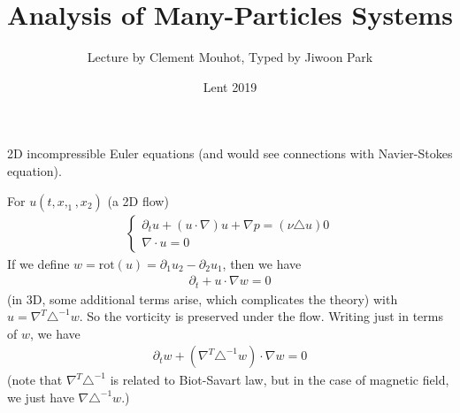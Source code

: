 \documentclass[12pt,a4paper]{extarticle}
\DeclarePairedDelimiter\bignorm{\lVert}{\rVert}
\begin{document}
\newcommand{\lap}{\triangle} %
\newcommand{\s}{\vspace{10pt}}
\newcommand{\reals}{\mathbb{R}}

\newcommand{\eop}{\hfill  \textsl{(End of proof)} $\square$} %
\newcommand{\eos}{\hfill  \textsl{(End of statement)} $\square$} %

\newcommand{\norms}[2]{\bignorm[\big]{#1}_{#2}}
\newcommand{\snorms}[2]{\bignorm[\small]{#1}_{#2}}
\newcommand{\avg}{\mathbb{E}}
\newcommand{\prob}{\mathbb{P}}
\newcommand{\borel}{\mathscr{B}}
\newcommand{\EE}{\mathscr{E}}
\newcommand{\FF}{\mathscr{F}}
\newcommand{\LL}{\mathscr{L}}
\newcommand{\DD}{\mathscr{D}}
\newcommand{\GG}{\mathscr{G}}
\newcommand{\pa}{\partial}
\newcommand{\charac}{\bm{1}}
\let\emptyset\varnothing

\newcommand{\var}{\textnormal{Var}}
\newcommand{\ent}{\textnormal{Ent}}
\newcommand{\definer}{\mathbin{=\mkern-5.5mu\raisebox{0.9pt}{\scalebox{0.8}[0.8]{\textnormal{:}}}}}
\newcommand{\definel}{\mathbin{\raisebox{0.9pt}{\scalebox{0.8}[0.8]{\textnormal{:}}}\mkern-5.5mu=}}

\renewcommand{\vec}{\underline}
\renewcommand{\bar}{\overline}

\setcounter{callcounter}{0}

\newcommand{\call}{\tag{\arabic{section}.\arabic{callcounter}} \stepcounter{callcounter}}

\newcommand{\comment}[1]{\textcolor{red}{#1}}

\setlength\parindent{0pt}

\title{Analysis of Many-Particles Systems}
\author{Lecture by Clement Mouhot, Typed by Jiwoon Park}
\date{Lent 2019}
\maketitle
\s

2D incompressible Euler equations (and would see connections with Navier-Stokes equation).
\s

For $u(t,x,_1, x_2)$ (a 2D flow)
\begin{align*}
\begin{cases}
\pa_t u + (u\cdot \nabla) u + \nabla p = (\nu \lap u)0 \\
\nabla \cdot u=0
\end{cases}
\end{align*}
If we define $w = \text{rot}(u) = \pa_1 u_2 -\pa_2 u_1$, then we have
\begin{align*}
\pa_t + u\cdot \nabla w =0
\end{align*}
(in 3D, some additional terms arise, which complicates the theory) with $u = \nabla^T \lap^{-1}w$. So the vorticity is preserved under the flow. Writing just in terms of $w$, we have
\begin{align*}
\pa_t w + (\nabla^T \lap^{-1} w)\cdot \nabla w =0
\end{align*}
(note that $\nabla^T \lap^{-1}$ is related to Biot-Savart law, but in the case of magnetic field, we just have $\nabla \lap^{-1}w$.)
\s
\end{document}
